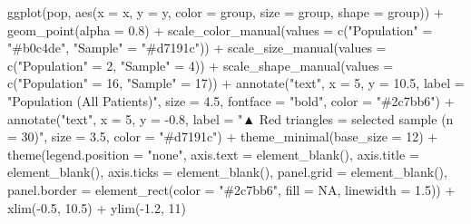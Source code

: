 \documentclass[
  12pt,
  letterpaper,
]{book}
\newenvironment{Shaded}{\begin{snugshade}}{\end{snugshade}}
\newcommand{\AttributeTok}[1]{\textcolor[rgb]{0.40,0.45,0.13}{#1}}
\newcommand{\ConstantTok}[1]{\textcolor[rgb]{0.56,0.35,0.01}{#1}}
\newcommand{\DecValTok}[1]{\textcolor[rgb]{0.68,0.00,0.00}{#1}}
\newcommand{\FloatTok}[1]{\textcolor[rgb]{0.68,0.00,0.00}{#1}}
\newcommand{\FunctionTok}[1]{\textcolor[rgb]{0.28,0.35,0.67}{#1}}
\newcommand{\NormalTok}[1]{\textcolor[rgb]{0.00,0.23,0.31}{#1}}
\newcommand{\OtherTok}[1]{\textcolor[rgb]{0.00,0.23,0.31}{#1}}
\newcommand{\SpecialCharTok}[1]{\textcolor[rgb]{0.37,0.37,0.37}{#1}}
\newcommand{\StringTok}[1]{\textcolor[rgb]{0.13,0.47,0.30}{#1}}
\newcounter{none} %
\begin{document}
\begin{Shaded}
\begin{Highlighting}[]
\FunctionTok{ggplot}\NormalTok{(pop, }\FunctionTok{aes}\NormalTok{(}\AttributeTok{x =}\NormalTok{ x, }\AttributeTok{y =}\NormalTok{ y, }\AttributeTok{color =}\NormalTok{ group, }\AttributeTok{size =}\NormalTok{ group, }\AttributeTok{shape =}\NormalTok{ group)) }\SpecialCharTok{+}
  \FunctionTok{geom\_point}\NormalTok{(}\AttributeTok{alpha =} \FloatTok{0.8}\NormalTok{) }\SpecialCharTok{+}
  \FunctionTok{scale\_color\_manual}\NormalTok{(}\AttributeTok{values =} \FunctionTok{c}\NormalTok{(}\StringTok{"Population"} \OtherTok{=} \StringTok{"\#b0c4de"}\NormalTok{, }\StringTok{"Sample"} \OtherTok{=} \StringTok{"\#d7191c"}\NormalTok{)) }\SpecialCharTok{+}
  \FunctionTok{scale\_size\_manual}\NormalTok{(}\AttributeTok{values =} \FunctionTok{c}\NormalTok{(}\StringTok{"Population"} \OtherTok{=} \DecValTok{2}\NormalTok{, }\StringTok{"Sample"} \OtherTok{=} \DecValTok{4}\NormalTok{)) }\SpecialCharTok{+}
  \FunctionTok{scale\_shape\_manual}\NormalTok{(}\AttributeTok{values =} \FunctionTok{c}\NormalTok{(}\StringTok{"Population"} \OtherTok{=} \DecValTok{16}\NormalTok{, }\StringTok{"Sample"} \OtherTok{=} \DecValTok{17}\NormalTok{)) }\SpecialCharTok{+}
  \FunctionTok{annotate}\NormalTok{(}\StringTok{"text"}\NormalTok{, }\AttributeTok{x =} \DecValTok{5}\NormalTok{, }\AttributeTok{y =} \FloatTok{10.5}\NormalTok{,}
           \AttributeTok{label =} \StringTok{"Population (All Patients)"}\NormalTok{,}
           \AttributeTok{size =} \FloatTok{4.5}\NormalTok{, }\AttributeTok{fontface =} \StringTok{"bold"}\NormalTok{, }\AttributeTok{color =} \StringTok{"\#2c7bb6"}\NormalTok{) }\SpecialCharTok{+}
  \FunctionTok{annotate}\NormalTok{(}\StringTok{"text"}\NormalTok{, }\AttributeTok{x =} \DecValTok{5}\NormalTok{, }\AttributeTok{y =} \SpecialCharTok{{-}}\FloatTok{0.8}\NormalTok{,}
           \AttributeTok{label =} \StringTok{"▲ Red triangles = selected sample (n = 30)"}\NormalTok{,}
           \AttributeTok{size =} \FloatTok{3.5}\NormalTok{, }\AttributeTok{color =} \StringTok{"\#d7191c"}\NormalTok{) }\SpecialCharTok{+}
  \FunctionTok{theme\_minimal}\NormalTok{(}\AttributeTok{base\_size =} \DecValTok{12}\NormalTok{) }\SpecialCharTok{+}
  \FunctionTok{theme}\NormalTok{(}\AttributeTok{legend.position =} \StringTok{"none"}\NormalTok{,}
        \AttributeTok{axis.text =} \FunctionTok{element\_blank}\NormalTok{(),}
        \AttributeTok{axis.title =} \FunctionTok{element\_blank}\NormalTok{(),}
        \AttributeTok{axis.ticks =} \FunctionTok{element\_blank}\NormalTok{(),}
        \AttributeTok{panel.grid =} \FunctionTok{element\_blank}\NormalTok{(),}
        \AttributeTok{panel.border =} \FunctionTok{element\_rect}\NormalTok{(}\AttributeTok{color =} \StringTok{"\#2c7bb6"}\NormalTok{, }\AttributeTok{fill =} \ConstantTok{NA}\NormalTok{, }\AttributeTok{linewidth =} \FloatTok{1.5}\NormalTok{)) }\SpecialCharTok{+}
  \FunctionTok{xlim}\NormalTok{(}\SpecialCharTok{{-}}\FloatTok{0.5}\NormalTok{, }\FloatTok{10.5}\NormalTok{) }\SpecialCharTok{+} \FunctionTok{ylim}\NormalTok{(}\SpecialCharTok{{-}}\FloatTok{1.2}\NormalTok{, }\DecValTok{11}\NormalTok{)}
\end{Highlighting}
\end{Shaded}
\end{document}
